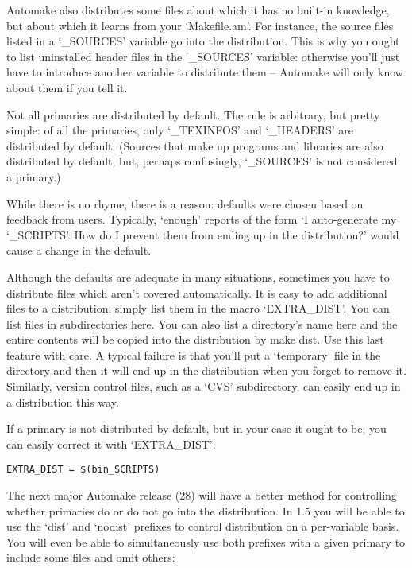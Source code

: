 Automake also distributes some files about which it has no built-in knowledge, but about which it learns from your `Makefile.am'. For instance, the source files listed in a `\_{}SOURCES' variable go into the distribution. This is why you ought to list uninstalled header files in the `\_{}SOURCES' variable: otherwise you'll just have to introduce another variable to distribute them -- Automake will only know about them if you tell it.

Not all primaries are distributed by default. The rule is arbitrary, but pretty simple: of all the primaries, only `\_{}TEXINFOS' and `\_{}HEADERS' are distributed by default. (Sources that make up programs and libraries are also distributed by default, but, perhaps confusingly, `\_{}SOURCES' is not considered a primary.)

While there is no rhyme, there is a reason: defaults were chosen based on feedback from users. Typically, `enough' reports of the form `I auto-generate my `\_{}SCRIPTS'. How do I prevent them from ending up in the distribution?' would cause a change in the default.

Although the defaults are adequate in many situations, sometimes you have to distribute files which aren't covered automatically. It is easy to add additional files to a distribution; simply list them in the macro `EXTRA\_{}DIST'. You can list files in subdirectories here. You can also list a directory's name here and the entire contents will be copied into the distribution by make dist. Use this last feature with care. A typical failure is that you'll put a `temporary' file in the directory and then it will end up in the distribution when you forget to remove it. Similarly, version control files, such as a `CVS' subdirectory, can easily end up in a distribution this way.

If a primary is not distributed by default, but in your case it ought to be, you can easily correct it with `EXTRA\_{}DIST': 

\begin{Verbatim}[frame=single]
EXTRA_DIST = $(bin_SCRIPTS)
\end{Verbatim}

The next major Automake release (28) will have a better method for controlling whether primaries do or do not go into the distribution. In 1.5 you will be able to use the `dist' and `nodist' prefixes to control distribution on a per-variable basis. You will even be able to simultaneously use both prefixes with a given primary to include some files and omit others:

